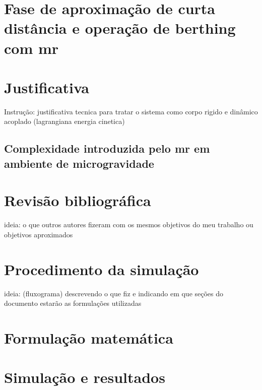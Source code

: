 






\section{Fase de aproximação de curta distância e operação de berthing com \gls{mr}}




\section{Justificativa}
Instrução: justificativa tecnica para tratar o sistema como corpo rigido e dinâmico acoplado (lagrangiana energia cinetica)

\subsection{Complexidade introduzida pelo \gls{mr} em ambiente de microgravidade}


\section{Revisão bibliográfica}
ideia: o que outros autores fizeram com os mesmos objetivos do meu trabalho ou objetivos aproximados

\section{Procedimento da simulação}
ideia: (fluxograma) descrevendo o que fiz e indicando em que seções do documento estarão as formulações utilizadas

\section{Formulação matemática}

\section{Simulação e resultados}

